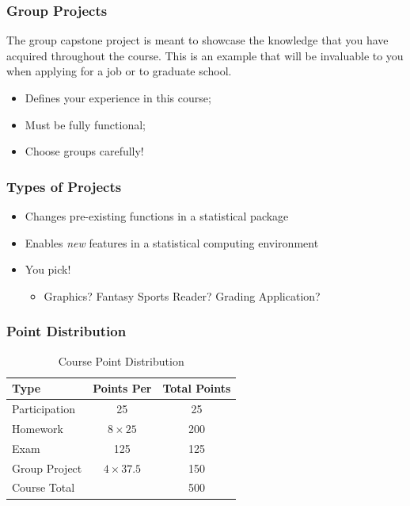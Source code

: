 \documentclass{beamer}\usepackage[]{graphicx}\usepackage[]{color}
\begin{document}
\begin{frame}
\frametitle{Group Projects}
The group capstone project is meant to showcase the knowledge that you have acquired throughout the course. This is an example that will be invaluable to you when applying for a job or to graduate school. 

\begin{itemize}
\item Defines your experience in this course;
\item Must be fully functional;
\item Choose groups carefully!
\end{itemize}

\end{frame}

\begin{frame}
\frametitle{Types of Projects}
\begin{itemize}
\item Changes pre-existing functions in a statistical package
\item Enables \emph{new} features in a statistical computing environment
\item You pick!
\begin{itemize}
\item Graphics? Fantasy Sports Reader? Grading Application? 
\end{itemize}
\end{itemize}
\end{frame}

\begin{frame}
\frametitle{Point Distribution}

\begin{table}
\centering
\begin{tabular}{lcc}
\toprule
Type & Points Per & Total Points\\ \midrule
Participation & 25 & 25  \\ 
Homework & $8 \times 25$  & 200  \\
Exam & 125 & 125 \\ 
Group Project & $4 \times 37.5$  & 150  \\ \bottomrule
Course Total &  & 500 \\ 
\end{tabular}
\caption{Course Point Distribution}
\label{tab:course}
\end{table}

\end{frame}
\end{document}
